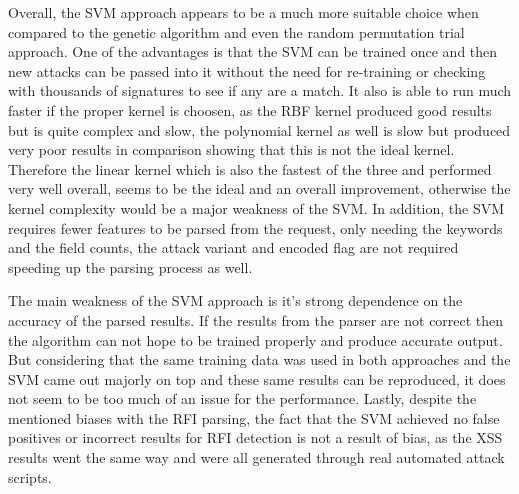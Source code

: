 Overall, the SVM approach appears to be a much more suitable choice when compared to the genetic algorithm and even the random permutation trial approach.  One of the advantages is that the SVM can be trained once and then new attacks can be passed into it without the need for re-training or checking with thousands of signatures to see if any are a match.  It also is able to run much faster if the proper kernel is choosen, as the RBF kernel produced good results but is quite complex and slow, the polynomial kernel as well is slow but produced very poor results in comparison showing that this is not the ideal kernel.  Therefore the linear kernel which is also the fastest of the three and performed very well overall, seems to be the ideal and an overall improvement, otherwise the kernel complexity would be a major weakness of the SVM.  In addition, the SVM requires fewer features to be parsed from the request, only needing the keywords and the field counts, the attack variant and encoded flag are not required speeding up the parsing process as well.

The main weakness of the SVM approach is it's strong dependence on the accuracy of the parsed results.  If the results from the parser are not correct then the algorithm can not hope to be trained properly and produce accurate output.  But considering that the same training data was used in both approaches and the SVM came out majorly on top and these same results can be reproduced, it does not seem to be too much of an issue for the performance.  Lastly, despite the mentioned biases with the RFI parsing, the fact that the SVM achieved no false positives or incorrect results for RFI detection is not a result of bias, as the XSS results went the same way and were all generated through real automated attack scripts.

